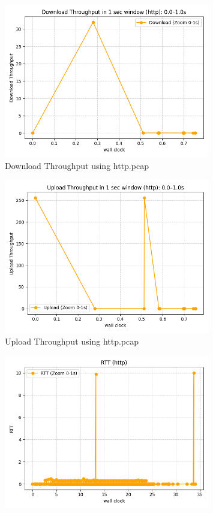 \documentclass[12pt]{article}
\begin{document}
\begin{enumerate}
\begin{enumerate}
        \begin{figure}[h!]
            \centering
            \includegraphics[width=0.8\textwidth]{down_throughput.png}
            \caption{Download Throughput using http.pcap}
        \end{figure}
        \begin{figure}[h!]
            \centering
            \includegraphics[width=0.8\textwidth]{up_throughput.png}
            \caption{Upload Throughput using http.pcap}
        \end{figure}
        \begin{figure}[h!]
            \centering
            \includegraphics[width=0.8\textwidth]{rtt.png}

\end{figure}
\end{enumerate}
\end{enumerate}
\end{document}
